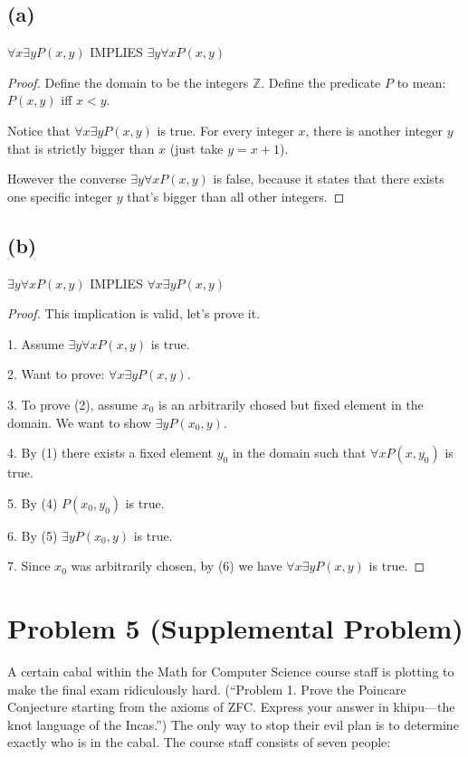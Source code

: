 \documentclass[14pt]{extarticle}
\begin{document}
\subsection{(a)}
$\forall x \exists y P(x, y)$ IMPLIES $\exists y \forall x P(x, y)$
\begin{proof}
Define the domain to be the integers $\mathbb{Z}$. Define the predicate $P$ to mean: $P(x, y)$ iff $x < y$.

Notice that $\forall x \exists y P(x, y)$ is true. For every integer $x$, there is another integer $y$ that is strictly bigger than $x$ (just take $y = x+1$).

However the converse $\exists y \forall x P(x, y)$ is false, because it states that there exists one specific integer $y$ that's bigger than all other integers.
\end{proof}

\subsection{(b)}
$\exists y \forall x P(x, y)$ IMPLIES $\forall x \exists y P(x, y)$
\begin{proof}
This implication is valid, let's prove it.

1. Assume $\exists y \forall x P(x, y)$ is true. 

2. Want to prove: $\forall x \exists y P(x, y)$.

3. To prove (2), assume $x_0$ is an arbitrarily chosed but fixed element in the domain. We want to show $\exists y P(x_0, y)$.

4. By (1) there exists a fixed element $y_0$ in the domain such that $\forall x P(x, y_0)$ is true.

5. By (4) $P(x_0, y_0)$ is true.

6. By (5) $\exists y P(x_0, y)$ is true.

7. Since $x_0$ was arbitrarily chosen, by (6) we have $\forall x \exists y P(x, y)$ is true.
\end{proof}

\section{Problem 5 (Supplemental Problem)}
A certain cabal within the Math for Computer Science course staff is plotting to make the final exam ridiculously hard. (“Problem 1. Prove the Poincare Conjecture starting from the axioms of ZFC. Express your answer in khipu—the knot language of the Incas.”) The only way to stop their evil plan is to determine exactly who is in the cabal. The course staff consists of seven people:
\end{document}
